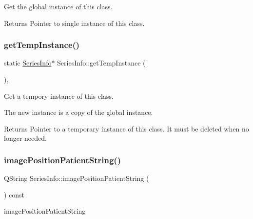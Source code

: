 Get the global instance of this class. 

\begin{DoxyReturn}{Returns}
Pointer to single instance of this class. 
\end{DoxyReturn}
\mbox{\label{class_series_info_a8895ba10eb144998e6d15d57524f8ec1}} 
\subsubsection{\texorpdfstring{get\+Temp\+Instance()}{getTempInstance()}}
{\footnotesize\ttfamily static \hyperlink{class_series_info}{Series\+Info}$\ast$ Series\+Info\+::get\+Temp\+Instance (\begin{DoxyParamCaption}{ }\end{DoxyParamCaption})\hspace{0.3cm}{\ttfamily [inline]}, {\ttfamily [static]}}



Get a tempory instance of this class. 

The new instance is a copy of the global instance. \begin{DoxyReturn}{Returns}
Pointer to a temporary instance of this class. It must be {\ttfamily delete}d when no longer needed. 
\end{DoxyReturn}
\mbox{\label{class_series_info_ae0d61a82f9fe9caed2832478c2a2ed35}} 
\subsubsection{\texorpdfstring{image\+Position\+Patient\+String()}{imagePositionPatientString()}\hspace{0.1cm}{\footnotesize\ttfamily [1/2]}}
{\footnotesize\ttfamily Q\+String Series\+Info\+::image\+Position\+Patient\+String (\begin{DoxyParamCaption}{ }\end{DoxyParamCaption}) const}



image\+Position\+Patient\+String 


